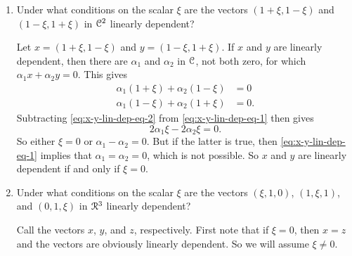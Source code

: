 \begin{enumerate}
\item Under what conditions on the scalar $\xi$ are the vectors
  $(1+\xi, 1-\xi)$ and $(1-\xi, 1+\xi)$ in $\mathcal{C}^2$ linearly dependent?
  \begin{solution}
    Let $x = (1+\xi,1-\xi)$ and $y = (1-\xi, 1+\xi)$. If $x$ and $y$
    are linearly dependent, then there are $\alpha_1$ and $\alpha_2$
    in $\mathcal{C}$, not both zero, for which $\alpha_1x + \alpha_2y =
    0$. This gives
    \begin{align}
      \alpha_1(1 + \xi) + \alpha_2(1 - \xi) &= 0
      \label{eq:x-y-lin-dep-eq-1}\\
      \alpha_1(1 - \xi) + \alpha_2(1 + \xi) &= 0.
      \label{eq:x-y-lin-dep-eq-2}
    \end{align}
    Subtracting \eqref{eq:x-y-lin-dep-eq-2} from
    \eqref{eq:x-y-lin-dep-eq-1} then gives
    \begin{equation*}
      2\alpha_1\xi - 2\alpha_2\xi = 0.
    \end{equation*}
    So either $\xi = 0$ or $\alpha_1 - \alpha_2 = 0$. But if the
    latter is true, then \eqref{eq:x-y-lin-dep-eq-1} implies that
    $\alpha_1 = \alpha_2 = 0$, which is not possible. So $x$ and $y$
    are linearly dependent if and only if $\xi = 0$.
  \end{solution}
\item Under what conditions on the scalar $\xi$ are the vectors
  $(\xi, 1, 0)$, $(1, \xi, 1)$, and $(0, 1, \xi)$ in $\mathcal{R}^3$ linearly
  dependent?
  \begin{solution}
    Call the vectors $x$, $y$, and $z$, respectively. First note that
    if $\xi = 0$, then $x = z$ and the vectors are obviously linearly
    dependent. So we will assume $\xi\neq0$.


\end{solution}
\end{enumerate}
